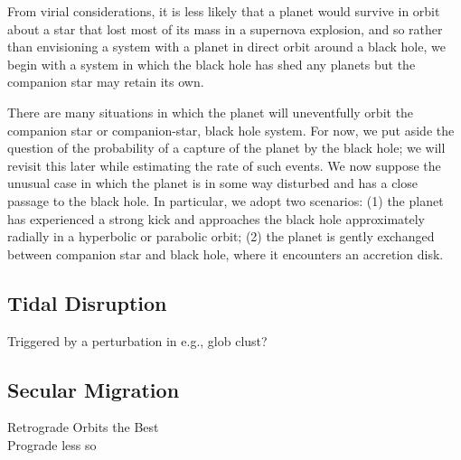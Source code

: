 From virial considerations, it is less likely that a planet would
survive in orbit about a star that lost most of its mass in a
supernova explosion, and so rather than envisioning a system with a
planet in direct orbit around a black hole, we begin with a system in
which the black hole has shed any planets but the companion star may
retain its own.


There are many situations in which the planet will uneventfully orbit
the companion star or companion-star, black hole system.  For now, we
put aside the question of the probability of a capture of the planet
by the black hole; we will revisit this later while estimating the
rate of such events.  We now suppose the unusual case in which the
planet is in some way disturbed and has a close passage to the black
hole.  In particular, we adopt two scenarios: (1) the planet has
experienced a strong kick and approaches the black hole approximately
radially in a hyperbolic or parabolic orbit; (2) the planet is gently
exchanged between companion star and black hole, where it encounters
an accretion disk.


\subsection{Tidal Disruption}
Triggered by a perturbation in e.g., glob clust?


\subsection{Secular Migration}
Retrograde Orbits the Best\\
Prograde less so
